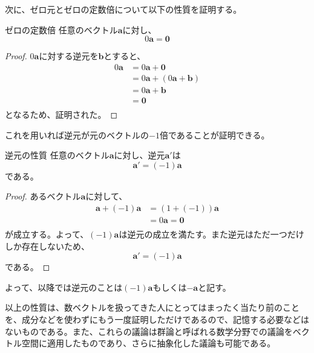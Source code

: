 次に、ゼロ元とゼロの定数倍について以下の性質を証明する。
\begin{theorem*}{ゼロの定数倍}
	任意のベクトル\(\boldsymbol{a}\)に対し、
	\begin{equation}
		0\boldsymbol{a}=\boldsymbol{0}
	\end{equation}
\end{theorem*}
\begin{proof}
	\(0\boldsymbol{a}\)に対する逆元を\(\boldsymbol{b}\)とすると、
	\begin{equation}
		\begin{split}
			0\boldsymbol{a} &=  0\boldsymbol{a}+\boldsymbol{0} \\
			&= 0\boldsymbol{a}+(0\boldsymbol{a}+\boldsymbol{b}) \\
			&= 0\boldsymbol{a}+\boldsymbol{b} \\
			&=\boldsymbol{0} \\
		\end{split}
	\end{equation}
	となるため、証明された。
\end{proof}

これを用いれば逆元が元のベクトルの\(-1\)倍であることが証明できる。
\begin{theorem*}{逆元の性質}
	任意のベクトル\(\boldsymbol{a}\)に対し、逆元\(\boldsymbol{a}'\)は
	\begin{equation}
		\boldsymbol{a}'=(-1)\boldsymbol{a}
	\end{equation}
	である。
\end{theorem*}
\begin{proof}
	あるベクトル\(\boldsymbol{a}\)に対して、
	\begin{equation}
		\begin{split}
			\boldsymbol{a}+(-1)\boldsymbol{a} &=  (1+(-1))\boldsymbol{a}\\
			&=0\boldsymbol{a}=\boldsymbol{0} \\
		\end{split}
	\end{equation}
	が成立する。よって、\((-1)\boldsymbol{a}\)は逆元の成立を満たす。また逆元はただ一つだけしか存在しないため、
	\begin{equation}
		\boldsymbol{a}'=(-1)\boldsymbol{a}
	\end{equation}
	である。
\end{proof}
よって、以降では逆元のことは\((-1)\boldsymbol{a}\)もしくは\(-\boldsymbol{a}\)と記す。

以上の性質は、数ベクトルを扱ってきた人にとってはまったく当たり前のことを、成分などを使わずにもう一度証明しただけであるので、記憶する必要などはないものである。また、これらの議論は群論と呼ばれる数学分野での議論をベクトル空間に適用したものであり、さらに抽象化した議論も可能である。


